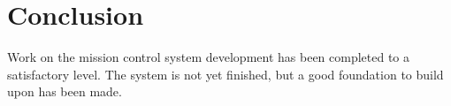 \section{Conclusion}\label{sec:conclusion}
Work on the mission control system development has been completed to a satisfactory level. The system is not yet finished, but a good foundation to build upon has been made.